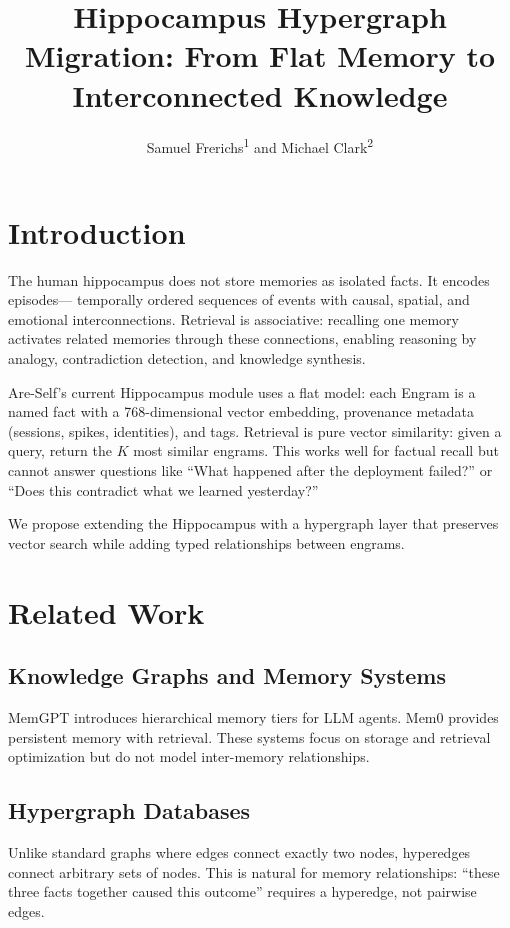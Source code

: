 \documentclass[man,12pt,floatsintext]{apa7}
\title{Hippocampus Hypergraph Migration: From Flat Memory to Interconnected Knowledge}
\author{Samuel Frerichs\textsuperscript{1} and Michael Clark\textsuperscript{2}}
\affiliation{\textsuperscript{1}University of Pittsburgh at Applied Sciences \\
\textsuperscript{2}Independent Researcher, scipraxian}
\begin{document}
\maketitle

\section{Introduction}

The human hippocampus does not store memories as isolated facts. It encodes episodes---
temporally ordered sequences of events with causal, spatial, and emotional
interconnections. Retrieval is associative: recalling one memory activates related
memories through these connections, enabling reasoning by analogy, contradiction
detection, and knowledge synthesis.

Are-Self's current Hippocampus module uses a flat model: each Engram is a named fact with
a 768-dimensional vector embedding, provenance metadata (sessions, spikes, identities),
and tags. Retrieval is pure vector similarity: given a query, return the $K$ most
similar engrams. This works well for factual recall but cannot answer questions like
``What happened after the deployment failed?'' or ``Does this contradict what we learned
yesterday?''

We propose extending the Hippocampus with a hypergraph layer that preserves vector search
while adding typed relationships between engrams.

\section{Related Work}

\subsection{Knowledge Graphs and Memory Systems}

MemGPT \parencite{} introduces hierarchical memory tiers for LLM agents. Mem0 provides
persistent memory with retrieval. These systems focus on storage and retrieval optimization
but do not model inter-memory relationships.

\subsection{Hypergraph Databases}

Unlike standard graphs where edges connect exactly two nodes, hyperedges connect arbitrary
sets of nodes. This is natural for memory relationships: ``these three facts together
caused this outcome'' requires a hyperedge, not pairwise edges.
\end{document}
